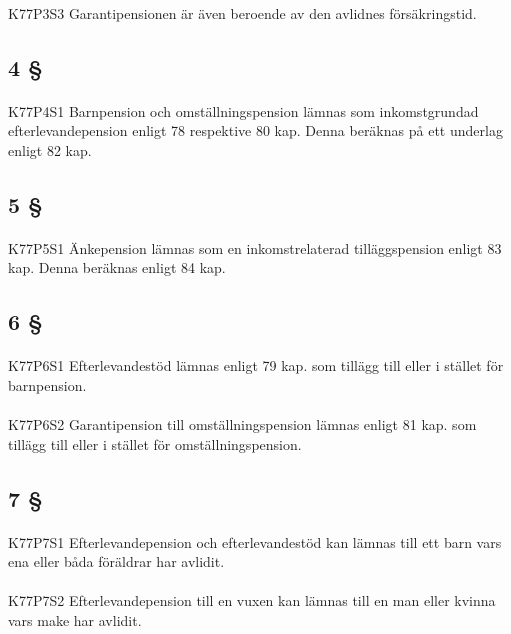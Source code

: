 \documentclass[a4paper,notitlepage,openany,10pt]{book}
\begin{document}
\paragraph*{}
{\tiny K77P3S3}
Garantipensionen är även beroende av den avlidnes försäkringstid.
\subsection*{4 §}
\paragraph*{}
{\tiny K77P4S1}
Barnpension och omställningspension lämnas som inkomstgrundad efterlevandepension enligt 78 respektive 80 kap. Denna beräknas på ett underlag enligt 82 kap.
\subsection*{5 §}
\paragraph*{}
{\tiny K77P5S1}
Änkepension lämnas som en inkomstrelaterad tilläggspension enligt 83 kap. Denna beräknas enligt 84 kap.
\subsection*{6 §}
\paragraph*{}
{\tiny K77P6S1}
Efterlevandestöd lämnas enligt 79 kap. som tillägg till eller i stället för barnpension.
\paragraph*{}
{\tiny K77P6S2}
Garantipension till omställningspension lämnas enligt 81 kap.
som tillägg till eller i stället för omställningspension.
\subsection*{7 §}
\paragraph*{}
{\tiny K77P7S1}
Efterlevandepension och efterlevandestöd kan lämnas till ett barn vars ena eller båda föräldrar har avlidit.
\paragraph*{}
{\tiny K77P7S2}
Efterlevandepension till en vuxen kan lämnas till en man eller kvinna vars make har avlidit.
\end{document}
